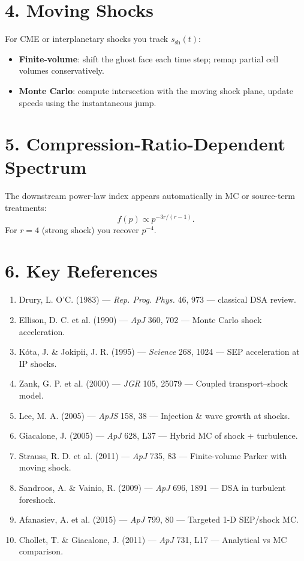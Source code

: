 \hrulefill

\section*{4. Moving Shocks}

For CME or interplanetary shocks you track $s_{\text{sh}}(t)$:

\begin{itemize}
    \item \textbf{Finite-volume}: shift the ghost face each time step; remap partial cell volumes conservatively.
    \item \textbf{Monte Carlo}: compute intersection with the moving shock plane, update speeds using the instantaneous jump.
\end{itemize}

\hrulefill

\section*{5. Compression-Ratio-Dependent Spectrum}

The downstream power-law index appears automatically in MC or source-term treatments:
\[
f(p) \propto p^{-3r/(r-1)}.
\]
For $r = 4$ (strong shock) you recover $p^{-4}$.

\hrulefill

\section*{6. Key References}

\begin{enumerate}
    \item Drury, L. O'C. (1983) — \textit{Rep. Prog. Phys.} 46, 973 — classical DSA review.
    \item Ellison, D. C. et al. (1990) — \textit{ApJ} 360, 702 — Monte Carlo shock acceleration.
    \item Kóta, J. \& Jokipii, J. R. (1995) — \textit{Science} 268, 1024 — SEP acceleration at IP shocks.
    \item Zank, G. P. et al. (2000) — \textit{JGR} 105, 25079 — Coupled transport–shock model.
    \item Lee, M. A. (2005) — \textit{ApJS} 158, 38 — Injection \& wave growth at shocks.
    \item Giacalone, J. (2005) — \textit{ApJ} 628, L37 — Hybrid MC of shock + turbulence.
    \item Strauss, R. D. et al. (2011) — \textit{ApJ} 735, 83 — Finite-volume Parker with moving shock.
    \item Sandroos, A. \& Vainio, R. (2009) — \textit{ApJ} 696, 1891 — DSA in turbulent foreshock.
    \item Afanasiev, A. et al. (2015) — \textit{ApJ} 799, 80 — Targeted 1-D SEP/shock MC.
    \item Chollet, T. \& Giacalone, J. (2011) — \textit{ApJ} 731, L17 — Analytical vs MC comparison.
\end{enumerate}

